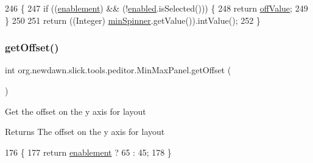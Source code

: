 \begin{DoxyCode}
246                         \{
247         \textcolor{keywordflow}{if} ((\mbox{\hyperlink{classorg_1_1newdawn_1_1slick_1_1tools_1_1peditor_1_1_min_max_panel_a82cdf912c2f081581d288b771c431703}{enablement}}) && (!\mbox{\hyperlink{classorg_1_1newdawn_1_1slick_1_1tools_1_1peditor_1_1_min_max_panel_aff685339c4d9c4cf8009bcfbf2bc72de}{enabled}}.isSelected())) \{
248             \textcolor{keywordflow}{return} \mbox{\hyperlink{classorg_1_1newdawn_1_1slick_1_1tools_1_1peditor_1_1_min_max_panel_a5abd0ceb9a2307cef6de8fbade8039db}{offValue}};
249         \}
250         
251         \textcolor{keywordflow}{return} ((Integer) \mbox{\hyperlink{classorg_1_1newdawn_1_1slick_1_1tools_1_1peditor_1_1_min_max_panel_ae09b9ecc2a254d7a74044bb20b6b62e6}{minSpinner}}.getValue()).intValue();
252     \}
\end{DoxyCode}
\mbox{\label{classorg_1_1newdawn_1_1slick_1_1tools_1_1peditor_1_1_min_max_panel_a58840fac9d2ca629b3a8149042c405fd}} 
\subsubsection{\texorpdfstring{get\+Offset()}{getOffset()}}
{\footnotesize\ttfamily int org.\+newdawn.\+slick.\+tools.\+peditor.\+Min\+Max\+Panel.\+get\+Offset (\begin{DoxyParamCaption}{ }\end{DoxyParamCaption})\hspace{0.3cm}{\ttfamily [inline]}}

Get the offset on the y axis for layout

\begin{DoxyReturn}{Returns}
The offset on the y axis for layout 
\end{DoxyReturn}

\begin{DoxyCode}
176                            \{
177         \textcolor{keywordflow}{return} \mbox{\hyperlink{classorg_1_1newdawn_1_1slick_1_1tools_1_1peditor_1_1_min_max_panel_a82cdf912c2f081581d288b771c431703}{enablement}} ? 65 : 45;
178     \}
\end{DoxyCode}
\mbox{\label{classorg_1_1newdawn_1_1slick_1_1tools_1_1peditor_1_1_min_max_panel_a2c266f8a36221ca788e748726349c9ec}} 
